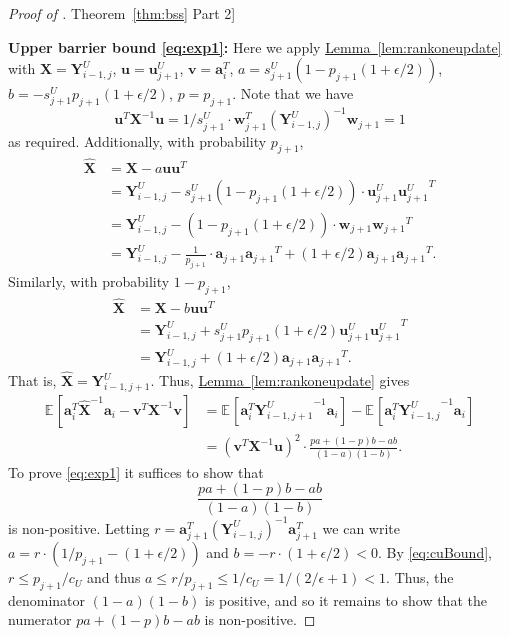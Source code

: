 \documentclass[11pt]{article}
\numberwithin{equation}{section}
\theoremstyle{definition}
\theoremstyle{plain}
\newcommand{\expref}[2]{\hyperref[#2]{#1~\ref{#2}}}
\newcommand{\bv}[1]{\mathbf{#1}}
\newcommand{\expct}[3]{\mathbb{E}_{{#1}_{#2}}\left[#3\right]}
\begin{document}
\begin{proof}[Proof of \expref{Theorem}{thm:bss} Part 2]
\smallskip

\noindent \textbf{Upper barrier bound \eqref{eq:exp1}:} Here we apply \expref{Lemma}{lem:rankoneupdate} with $\bv{X} = \bv{Y}^U_{i-1,j}$, $\bv{u} = \bv{u}^U_{j+1}$, $\bv{v} = \bv{a}_i^T$, $a = s^U_{j+1} (1 - p_{j+1} (1 + \epsilon / 2))$, $b = -s^U_{j+1} p_{j+1} (1 + \epsilon / 2)$, $p = p_{j+1}$. Note that we have
\[
  \bv{u}^T \bv{X}^{-1} \bv{u} = 1/s^U_{j+1} \cdot \bv{w}_{j+1}^T (\bv{Y}^U_{i-1,j})^{-1}  \bv{w}_{j+1} = 1
\]
as required. Additionally, with probability  $p_{j+1}$,
\begin{align*}
\bv{\widehat X} &= \bv{X} - a \bv{uu}^T\\ 
&=  \bv{Y}^U_{i-1,j} - s^U_{j+1} (1 - p_{j+1} (1 + \epsilon / 2)) \cdot \bv{u}_{j+1}^U {\bv{u}_{j+1}^U }^T\\
&=  \bv{Y}^U_{i-1,j} - (1 - p_{j+1} (1 + \epsilon / 2)) \cdot \bv{w}_{j+1} {\bv{w}_{j+1}}^T\\
&=  \bv{Y}^U_{i-1,j} - \frac{1}{p_{j+1}} \cdot \bv{a}_{j+1} {\bv{a}_{j+1}}^T + (1 + \epsilon / 2) \bv{a}_{j+1} {\bv{a}_{j+1}}^T.
\end{align*}
Similarly, with probability $1-p_{j+1}$,
\begin{align*}
\bv{\widehat X} &= \bv{X} - b \bv{uu}^T\\ 
&=   \bv{Y}^U_{i-1,j}  + s^U_{j+1} p_{j+1} (1 + \epsilon / 2) \bv{u}_{j+1}^U {\bv{u}_{j+1}^U }^T\\
& = \bv{Y}^U_{i-1,j} + (1 + \epsilon / 2) \bv{a}_{j+1} {\bv{a}_{j+1}}^T.
\end{align*}
That is, $\bv{\widehat X} = \bv{Y}^U_{i-1,j+1}$.  Thus, \expref{Lemma}{lem:rankoneupdate} gives
\begin{align*}
\expct{}{}{\bv{a}_i^T \bv{\widehat X}^{-1} \bv{a}_i - \bv{v}^T \bv{X}^{-1} \bv{v}}  &= \expct{}{}{\bv{a}_i^T {\bv{Y}^U_{i-1,j+1}}^{-1} \bv{a}_i} - \expct{}{}{\bv{a}_i^T {\bv{Y}^U_{i-1,j}}^{-1}  \bv{a}_i}\\
&= (\bv{v}^T \bv{X}^{-1} \bv{u})^2 \cdot \frac{pa + (1-p)b - ab}{(1-a)(1-b)}.
\end{align*}
To prove \eqref{eq:exp1} it suffices to show that
%
\[
  \frac{pa + (1-p)b - ab}{(1-a)(1-b)}
\]
is non-positive.  Letting
$r = \bv{a}_{j+1}^T (\bv{Y}^U_{i-1,j})^{-1} \bv{a}_{j+1}^T$ we can
write $a = r \cdot \left (1/p_{j+1} - (1+\epsilon/2) \right )$ and
$b = -r \cdot (1+\epsilon/2) < 0$. By \eqref{eq:cuBound},
$r \le p_{j+1}/{c_U}$ and thus
$a \le r/p_{j+1} \le 1/c_U = 1/(2/\epsilon + 1) < 1$. Thus, the
denominator $(1-a)(1-b)$ is positive, and so it remains to show that
the numerator $pa + (1-p)b - ab$ is non-positive. 

\end{proof}
\end{document}
